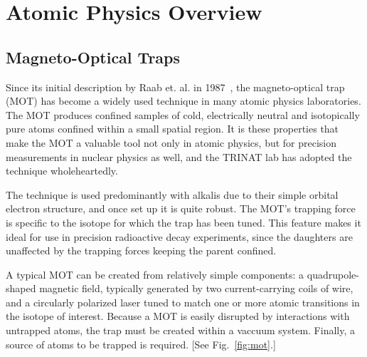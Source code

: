 %
%
%
\clearpage
\chapter{Atomic Physics Overview}
\label{atomicphysics_chapter}


\section{Magneto-Optical Traps}
Since its initial description by Raab et. al. in 1987~\cite{raabprentiss}, the magneto-optical trap (MOT) has become a widely used technique in many atomic physics laboratories.  The MOT produces confined samples of cold, electrically neutral and isotopically pure atoms confined within a small spatial region.  It is these properties that make the MOT a valuable tool not only in atomic physics, but for precision measurements in nuclear physics as well, and the TRINAT lab  has adopted the technique wholeheartedly.

The technique is used predominantly with alkalis due to their simple orbital electron structure,%
and once set up it is quite robust.  The MOT's trapping force is specific to the isotope for which the trap has been tuned. This feature makes it ideal for use in precision radioactive decay experiments, since the daughters are unaffected by the trapping forces keeping the parent confined.

A typical MOT can be created from relatively simple components:  a quadrupole-shaped magnetic field, typically generated by two current-carrying coils of wire, and a circularly polarized laser tuned to match one or more atomic transitions in the isotope of interest.  Because a MOT is easily disrupted by interactions with untrapped atoms, the trap must be created within a vaccuum system.  Finally, a source of atoms to be trapped is required.  [See Fig.~\ref{fig:mot}.]

